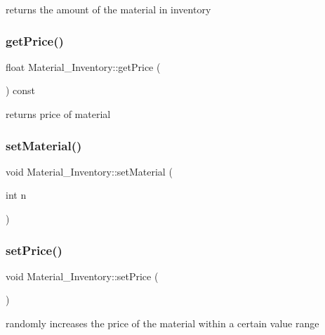 returns the amount of the material in inventory 

\mbox{\label{classMaterial__Inventory_a3e3bf78a963137fdf3be88cecbdcb778}} 
\subsubsection{\texorpdfstring{getPrice()}{getPrice()}}
{\footnotesize\ttfamily float Material\+\_\+\+Inventory\+::get\+Price (\begin{DoxyParamCaption}{ }\end{DoxyParamCaption}) const}



returns price of material 

\mbox{\label{classMaterial__Inventory_a45faf0563c18ed44ad143440c188a3a5}} 
\subsubsection{\texorpdfstring{setMaterial()}{setMaterial()}}
{\footnotesize\ttfamily void Material\+\_\+\+Inventory\+::set\+Material (\begin{DoxyParamCaption}\item[{int}]{n }\end{DoxyParamCaption})}

\mbox{\label{classMaterial__Inventory_a1ae3a7d9e3d42c8d5bfee551605722ee}} 
\subsubsection{\texorpdfstring{setPrice()}{setPrice()}}
{\footnotesize\ttfamily void Material\+\_\+\+Inventory\+::set\+Price (\begin{DoxyParamCaption}{ }\end{DoxyParamCaption})}



randomly increases the price of the material within a certain value range 



